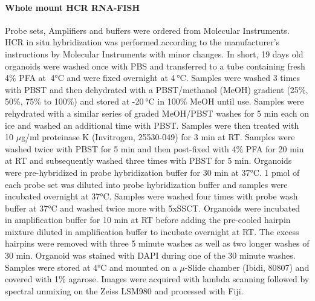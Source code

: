 \paragraph{Whole mount HCR RNA-FISH}
Probe sets, Amplifiers and buffers were ordered from Molecular Instruments. HCR in situ hybridization was performed according to the manufacturer’s instructions by Molecular Instruments with minor changes.  In short, 19 days old organoids were washed once with PBS and transferred to a tube containing fresh 4\% PFA at  4°C and were fixed overnight at 4 °C. Samples were washed 3 times with PBST and then dehydrated with a PBST/methanol (MeOH) gradient (25\%, 50\%, 75\% to 100\%) and stored at -20 °C in 100\% MeOH until use. Samples were rehydrated with a similar series of graded MeOH/PBST washes for 5 min each on ice and washed an additional time with PBST. Samples were then treated with 10 $\mu$g/ml proteinase K (Invitrogen, 25530-049)  for 3 min at RT. Samples were washed twice with PBST for 5 min and then post-fixed with 4\% PFA for 20 min at RT and subsequently washed three times with PBST for 5 min. Organoids were pre-hybridized in probe hybridization buffer for 30 min at 37°C. 1 pmol of each probe set was diluted into probe hybridization buffer and samples were incubated overnight at 37°C. Samples were washed four times with probe wash buffer at 37°C and washed twice more with 5xSSCT. Organoids were incubated in amplification buffer for 10 min at RT before adding the pre-cooled hairpin mixture diluted in amplification buffer to incubate overnight at RT. The excess hairpins were removed with three 5 minute washes as well as two longer washes of 30 min. Organoid was stained with DAPI during one of the 30 minute washes. Samples were stored at 4°C and mounted on a $\mu$-Slide chamber (Ibidi, 80807) and covered with 1\% agarose. Images were acquired with lambda scanning followed by spectral unmixing on the Zeiss LSM980 and processed with Fiji.
 
